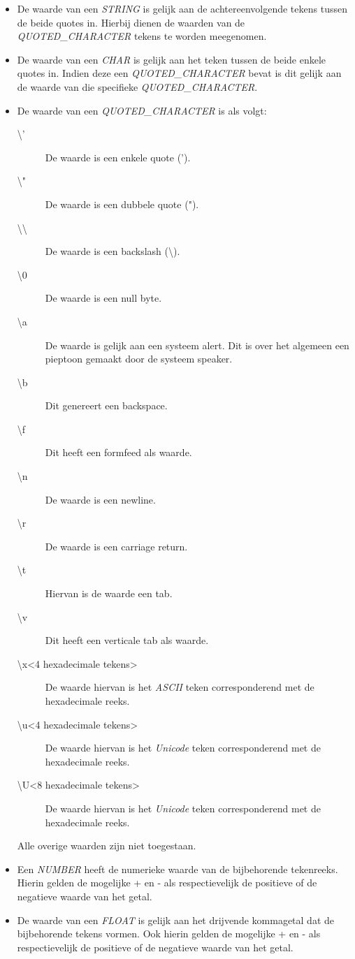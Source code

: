 \begin{itemize}
	\item De waarde van een \textit{STRING} is gelijk aan de achtereenvolgende tekens tussen de beide quotes in. Hierbij dienen de waarden van de \textit{QUOTED\_CHARACTER} tekens te worden meegenomen.
	\item De waarde van een \textit{CHAR} is gelijk aan het teken tussen de beide enkele quotes in. Indien deze een \textit{QUOTED\_CHARACTER} bevat is dit gelijk aan de waarde van die specifieke \textit{QUOTED\_CHARACTER}.
	\item De waarde van een \textit{QUOTED\_CHARACTER} is als volgt:
	\begin{description}
		\item[\textbackslash'] De waarde is een enkele quote (').
		\item[\textbackslash"] De waarde is een dubbele quote (").
		\item[\textbackslash\textbackslash] De waarde is een backslash (\textbackslash).
		\item[\textbackslash0] De waarde is een null byte.
		\item[\textbackslash{}a] De waarde is gelijk aan een systeem alert. Dit is over het algemeen een pieptoon gemaakt door de systeem speaker.
		\item[\textbackslash{}b] Dit genereert een backspace.
		\item[\textbackslash{}f] Dit heeft een formfeed als waarde.
		\item[\textbackslash{}n] De waarde is een newline.
		\item[\textbackslash{}r] De waarde is een carriage return.
		\item[\textbackslash{}t] Hiervan is de waarde een tab.
		\item[\textbackslash{}v] Dit heeft een verticale tab als waarde.
		\item[\textbackslash{}x\textless4 hexadecimale tekens\textgreater] De waarde hiervan is het \textit{ASCII} teken corresponderend met de hexadecimale reeks.
		\item[\textbackslash{}u\textless4 hexadecimale tekens\textgreater] De waarde hiervan is het \textit{Unicode} teken corresponderend met de hexadecimale reeks.
		\item[\textbackslash{}U\textless8 hexadecimale tekens\textgreater] De waarde hiervan is het \textit{Unicode} teken corresponderend met de hexadecimale reeks.
	\end{description}
	Alle overige waarden zijn niet toegestaan.
	\item Een \textit{NUMBER} heeft de numerieke waarde van de bijbehorende tekenreeks. Hierin gelden de mogelijke + en - als respectievelijk de positieve of de negatieve waarde van het getal.
	\item De waarde van een \textit{FLOAT} is gelijk aan het drijvende kommagetal dat de bijbehorende tekens vormen. Ook hierin gelden de mogelijke + en - als respectievelijk de positieve of de negatieve waarde van het getal.
\end{itemize}


